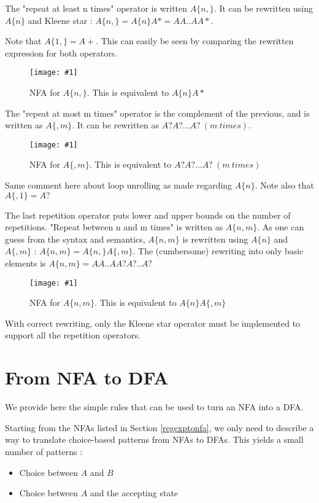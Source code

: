 \documentclass[11pt,a4paper]{report}
\newcommand{\regexp}[1]{$#1$}
\newcommand{\insertfa}[3]{
\begin{figure}[h!]
	\centering
	\texttt{[image: \#1]}
	\caption{#2}
\end{figure}
}
\newcommand{\largenfa}[2]{\insertfa{./img/nfa/#1.png}{NFA for #2}{width=\textwidth}}
\begin{document}
The "repeat at least n times" operator is written \regexp{A\{n,\}}. It can be rewritten using \regexp{A\{n\}} and Kleene star : \regexp{A\{n,\} = A\{n\}A* = AA..AA*}.

Note that \regexp{A\{1,\} = A+}. This can easily be seen by comparing the rewritten expression for both operators.

\largenfa{repeat-at-least-n-times}{\regexp{A\{n,\}}. This is equivalent to \regexp{A\{n\}A*}}

The "repeat at most m times" operator is the complement of the previous, and is written as \regexp{A\{,m\}}. It can be rewritten as \regexp{A?A?...A?\ (m\ times)}.

\largenfa{repeat-at-most-m-times}{\regexp{A\{,m\}}. This is equivalent to \regexp{A?A?...A?\ (m\ times)}}

Same comment here about loop unrolling as made regarding \regexp{A\{n\}}. Note also that \regexp{A\{,1\} = A?}

The last repetition operator puts lower and upper bounds on the number of repetitions. "Repeat between n and m times" is written as \regexp{A\{n, m\}}. As one can guess from the syntax and semantics, \regexp{A\{n, m\}} is rewritten using \regexp{A\{n\}} and \regexp{A\{, m\}} : \regexp{A\{n, m\} = A\{n, \}A\{, m\}}. The (cumbersome) rewriting into only basic elements is \regexp{A\{n, m\} = AA..AA?A?..A?}

\largenfa{repeat-between-n-and-m-times}{\regexp{A\{n,m\}}. This is equivalent to \regexp{A\{n\}A\{,m\}}}

With correct rewriting, only the Kleene star operator must be implemented to support all the repetition operators.

\section{From NFA to DFA}
\label{nfatodfa}

We provide here the simple rules that can be used to turn an NFA into a DFA.

Starting from the NFAs listed in Section \ref{regexptonfa}, we only need to describe a way to translate choice-based patterns from NFAs to DFAs. This yields a small number of patterns :
\begin{itemize}
\item Choice between $A$ and $B$
\item Choice between $A$ and the accepting state
\end{itemize}
\end{document}

